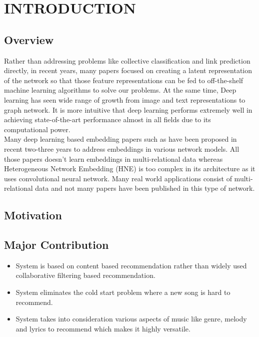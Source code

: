 \chapter{INTRODUCTION}
\label{chap:intro}
\section{Overview}
Rather than addressing problems like collective classification and link prediction directly, in recent years, many papers focused on creating a latent representation of the network so that those feature representations can be fed to off-the-shelf machine learning algorithms to solve our problems. At the same time, Deep learning has seen wide range of growth from image and text representations to graph network. It is more intuitive that deep learning performs extremely well in achieving state-of-the-art performance almost in all fields due to its computational power.\\

Many deep learning based embedding papers such as \cite{word2vec, deepwalk, author2vec, triparty, hne} have been proposed in recent two-three years to address embeddings in various network models. All those papers doesn't learn embeddings in multi-relational data whereas Heterogeneous Network Embedding (HNE) \cite{hne} is too complex in its architecture as it uses convolutional neural network. Many real world applications consist of multi-relational data and not many papers have been published in this type of network. 

\section{Motivation}



\section{Major Contribution}
\begin{itemize}
	\item{System is based on content based recommendation rather than widely used collaborative filtering based recommendation. }
	\item{System eliminates the cold start problem where a new song is hard to recommend.}
	\item{System takes into consideration various aspects of music like genre, melody and lyrics to recommend which makes it highly versatile.}
\end{itemize}

